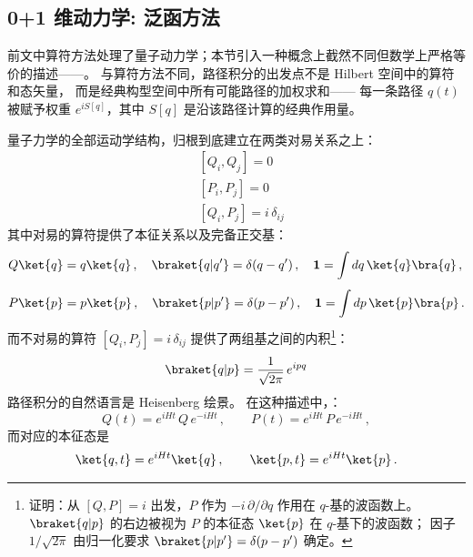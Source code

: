 \subsection{0+1 维动力学: 泛函方法}\label{0+1_path}

前文中算符方法处理了量子动力学；本节引入一种概念上截然不同但数学上严格等价的描述——。
与算符方法不同，路径积分的出发点不是 Hilbert 空间中的算符和态矢量，
而是经典构型空间中所有可能路径的加权求和——
每一条路径 $q(t)$ 被赋予权重 $e^{iS[q]}$，其中 $S[q]$ 是沿该路径计算的经典作用量。

\medskip
量子力学的全部运动学结构，归根到底建立在两类对易关系之上：
\begin{subequations}\label{eq:CCR}
  \begin{align}
    &[Q_i,Q_j]=0\\
    &[P_i,P_j]=0\\
    &[Q_i,P_j]=i\,\delta_{ij}
  \end{align}
\end{subequations}
其中对易的算符提供了本征关系以及完备正交基：
\begin{subequations}\label{eq:eigen-rel}
    \begin{align}
      &Q\ket{q}=q\ket{q}\,,\quad
      \braket{q|q'}=\delta(q-q')\,,\quad
      \mathbf{1}=\int dq\,\ket{q}\bra{q}\,,\\[4pt]
      &P\ket{p}=p\ket{p}\,,\quad
      \braket{p|p'}=\delta(p-p')\,,\quad
      \mathbf{1}=\int dp\,\ket{p}\bra{p}\,.
    \end{align}
\end{subequations}
而不对易的算符 $[Q_i,P_j]=i\,\delta_{ij}$
提供了两组基之间的内积\footnote{%
  证明：从 $[Q,P]=i$ 出发，$P$ 作为 $-i\,\partial/\partial q$
  作用在 $q$-基的波函数上。
  $\braket{q|p}$ 的右边被视为 $P$ 的本征态
  $\ket{p}$ 在 $q$-基下的波函数；
  因子 $1/\sqrt{2\pi}$ 由归一化要求
  $\braket{p|p'}=\delta(p-p')$ 确定。}：
\begin{equation}\label{eq:qp-overlap}
  \braket{q|p}=\frac{1}{\sqrt{2\pi}}\,e^{ipq}
\end{equation}
路径积分的自然语言是 Heisenberg 绘景。
在这种描述中，：
\begin{equation}\label{eq:Heis-ops}
  Q(t)=e^{iHt}\,Q\,e^{-iHt}\,,\qquad
  P(t)=e^{iHt}\,P\,e^{-iHt}\,,
\end{equation}
而对应的本征态是
\begin{equation}\label{eq:Heis-states}
  \ket{q,t}=e^{iHt}\ket{q}\,,\qquad
  \ket{p,t}=e^{iHt}\ket{p}\,.
\end{equation}

